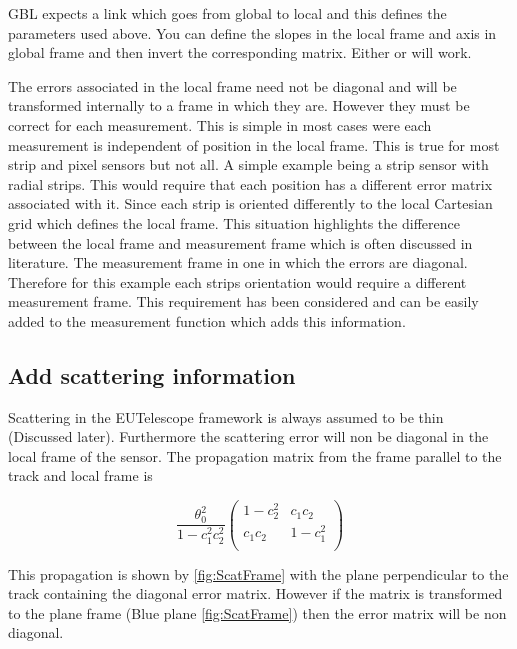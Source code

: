 GBL expects a link which goes from global to local and this defines the parameters used above. You can define the slopes in the local frame and axis in global frame and then invert the corresponding matrix. Either or will work.

The errors associated in the local frame need not be diagonal and will be transformed internally to a frame in which they are. However they must be correct for each measurement. This is simple in most cases were each measurement is independent of position in the local frame. This is true for most strip and pixel sensors but not all. A simple example being a strip sensor with radial strips. This would require that each position has a different error matrix associated with it. Since each strip is oriented differently to the local Cartesian grid which defines the local frame. This situation highlights the difference between the local frame and measurement frame which is often discussed in literature. The measurement frame in one in which the errors are diagonal. Therefore for this example each strips orientation would require a different measurement frame. This requirement has been considered and can be easily added to the measurement function which adds this information.



\subsection{Add scattering information}
\label{sec:scat}
Scattering in the EUTelescope framework is always assumed to be thin (Discussed later). Furthermore the scattering error will non be diagonal in the local frame of the sensor. The propagation matrix from the frame parallel to the track and local frame is

\[ 
\frac{\theta_{0}^{2}}{1-c^2_1 c^2_2}
\left(
  \begin{array}{cc}
 1-c^{2}_{2} & c_{1}c_{2}    \\
 c_{1}c_{2} & 1-c^{2}_{1} \\   
\end{array} \right)\] 



This propagation is shown by \ref{fig:ScatFrame} with the plane perpendicular to the track containing the diagonal error matrix. However if the matrix is transformed to the plane frame (Blue plane \ref{fig:ScatFrame}) then the error matrix will be non diagonal.

